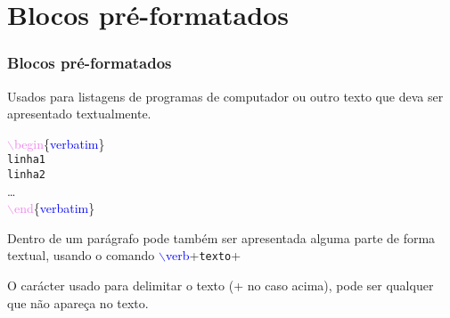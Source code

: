 \documentclass{beamer}
\begin{document}
\section{Blocos pré-formatados}
\begin{frame}
\frametitle{Blocos pré-formatados}
Usados para listagens de programas de computador ou outro texto que deva
ser apresentado textualmente.

\quad\textcolor{violet}{$\backslash$begin}\{\textcolor{blue}{verbatim}\}\\
\qquad \texttt{linha1}\\
\qquad \texttt{linha2}\\
\qquad\ldots\\
\quad\textcolor{violet}{$\backslash$end}\{\textcolor{blue}{verbatim}\}\pause

Dentro de um parágrafo pode também ser apresentada alguma parte de forma
textual, usando o comando \textcolor{blue}{$\backslash$verb}+\texttt{texto}+
\pause

O carácter usado para delimitar o texto (+ no caso acima), pode ser
qualquer que não apareça no texto.
\end{frame}
\end{document}
